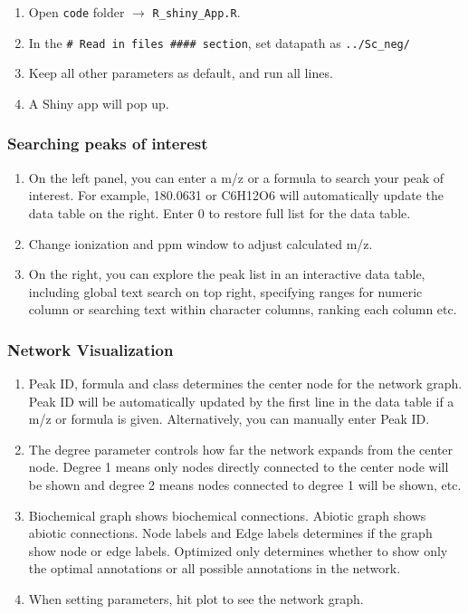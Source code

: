 \documentclass[]{article}
\begin{document}
\begin{enumerate}
\def\labelenumi{\arabic{enumi}.}
\item
  Open \texttt{code} folder \(\rightarrow\) \texttt{R\_shiny\_App.R}.
\item
  In the \texttt{\# Read in files \#\#\#\# section}, set datapath as \texttt{../Sc\_neg/}
\item
  Keep all other parameters as default, and run all lines.
\item
  A Shiny app will pop up.
\end{enumerate}

\hypertarget{searching-peaks-of-interest}{%
\subsubsection{Searching peaks of interest}\label{searching-peaks-of-interest}}

\begin{enumerate}
\def\labelenumi{\arabic{enumi}.}
\item
  On the left panel, you can enter a m/z or a formula to search your peak of interest. For example, 180.0631 or C6H12O6 will automatically update the data table on the right. Enter 0 to restore full list for the data table.
\item
  Change ionization and ppm window to adjust calculated m/z.
\item
  On the right, you can explore the peak list in an interactive data table, including global text search on top right, specifying ranges for numeric column or searching text within character columns, ranking each column etc.
\end{enumerate}

\hypertarget{network-visualization}{%
\subsubsection{Network Visualization}\label{network-visualization}}

\begin{enumerate}
\def\labelenumi{\arabic{enumi}.}
\item
  Peak ID, formula and class determines the center node for the network graph. Peak ID will be automatically updated by the first line in the data table if a m/z or formula is given. Alternatively, you can manually enter Peak ID.
\item
  The degree parameter controls how far the network expands from the center node. Degree 1 means only nodes directly connected to the center node will be shown and degree 2 means nodes connected to degree 1 will be shown, etc.
\item
  Biochemical graph shows biochemical connections. Abiotic graph shows abiotic connections. Node labels and Edge labels determines if the graph show node or edge labels. Optimized only determines whether to show only the optimal annotations or all possible annotations in the network.
\item
  When setting parameters, hit plot to see the network graph.
\end{enumerate}
\end{document}
